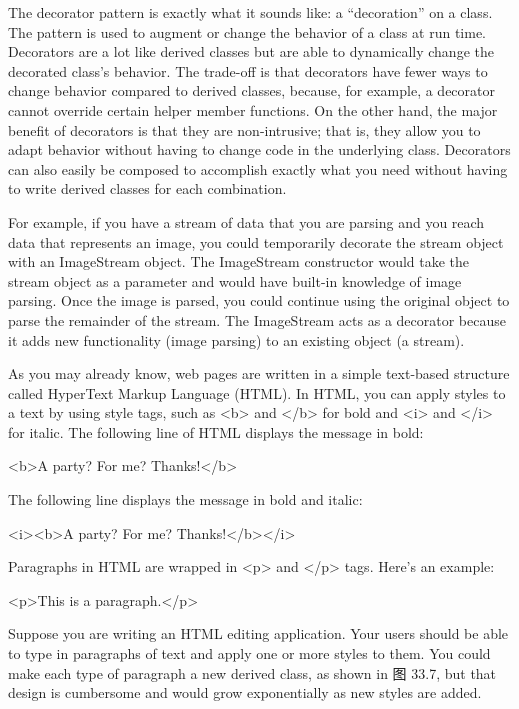 
The decorator pattern is exactly what it sounds like: a “decoration” on a class. The pattern is used to augment or change the behavior of a class at run time. Decorators are a lot like derived classes but are able to dynamically change the decorated class’s behavior. The trade-off is that decorators have fewer ways to change behavior compared to derived classes, because, for example, a decorator cannot override certain helper member functions. On the other hand, the major benefit of decorators is that they are non-intrusive; that is, they allow you to adapt behavior without having to change code in the underlying class. Decorators can also easily be composed to accomplish exactly what you need without having to write derived classes for each combination.

For example, if you have a stream of data that you are parsing and you reach data that represents an image, you could temporarily decorate the stream object with an ImageStream object. The ImageStream constructor would take the stream object as a parameter and would have built-in knowledge of image parsing. Once the image is parsed, you could continue using the original object to parse the remainder of the stream. The ImageStream acts as a decorator because it adds new functionality (image parsing) to an existing object (a stream).


As you may already know, web pages are written in a simple text-based structure called HyperText Markup Language (HTML). In HTML, you can apply styles to a text by using style tags, such as <b> and </b> for bold and <i> and </i> for italic. The following line of HTML displays the message in bold:

\begin{shell}
<b>A party? For me? Thanks!</b>
\end{shell}

The following line displays the message in bold and italic:

\begin{shell}
<i><b>A party? For me? Thanks!</b></i>
\end{shell}

Paragraphs in HTML are wrapped in <p> and </p> tags. Here’s an example:

\begin{shell}
<p>This is a paragraph.</p>
\end{shell}

Suppose you are writing an HTML editing application. Your users should be able to type in paragraphs of text and apply one or more styles to them. You could make each type of paragraph a new derived class, as shown in 图 33.7, but that design is cumbersome and would grow exponentially as new styles are added.

